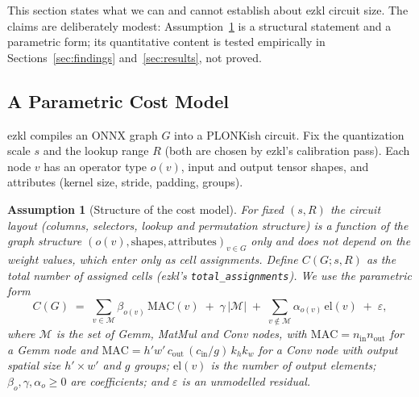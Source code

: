 \documentclass[10pt]{article}
\newtheorem{assumption}{Assumption}
\begin{document}
This section states what we can and cannot establish about ezkl circuit size.  The
claims are deliberately modest: Assumption~\ref{prop:cost} is a structural statement and
a parametric form; its quantitative content is tested empirically in
Sections~\ref{sec:findings} and~\ref{sec:results}, not proved.

\subsection{A Parametric Cost Model}

ezkl compiles an ONNX graph $G$ into a PLONKish circuit.  Fix the quantization scale $s$ and
the lookup range $R$ (both are chosen by ezkl's calibration pass).  Each node $v$ has an operator
type $o(v)$, input and output tensor shapes, and attributes (kernel size, stride, padding, groups).

\begin{assumption}[Structure of the cost model]
\label{prop:cost}
For fixed $(s,R)$ the circuit layout (columns, selectors, lookup and permutation structure) is a
function of the graph structure $(o(v),\text{shapes},\text{attributes})_{v\in G}$ only and does not
depend on the weight values, which enter only as cell assignments.  Define
$C(G;s,R)$ as the total number of assigned cells (ezkl's \texttt{total\_assignments}).  We use
the parametric form
\begin{equation}
C(G) \;=\; \sum_{v\in\mathcal{M}} \beta_{o(v)}\,\mathrm{MAC}(v)
 \;+\; \gamma\,|\mathcal{M}|
 \;+\; \sum_{v\notin\mathcal{M}} \alpha_{o(v)}\,\mathrm{el}(v)
 \;+\; \varepsilon ,
\label{eq:cost}
\end{equation}
where $\mathcal{M}$ is the set of Gemm, MatMul and Conv nodes, with
$\mathrm{MAC}=n_{\mathrm{in}}n_{\mathrm{out}}$ for a Gemm node and
$\mathrm{MAC}=h'w'\,c_{\mathrm{out}}\,(c_{\mathrm{in}}/g)\,k_hk_w$ for a Conv node with output
spatial size $h'\times w'$ and $g$ groups; $\mathrm{el}(v)$ is the number of output elements;
$\beta_o,\gamma,\alpha_o\ge 0$ are coefficients; and $\varepsilon$ is an unmodelled residual.
\end{assumption}
\end{document}
